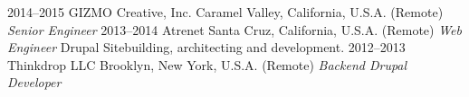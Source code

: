 \documentclass[]{friggeri-cv} %
\begin{document}
\begin{entrylist}
\entry
{2014--2015}
{GIZMO Creative, Inc.}
{Caramel Valley, California, U.S.A. (Remote)}
{\emph{Senior Engineer}
}
\entry
{2013--2014}
{Atrenet}
{Santa Cruz, California, U.S.A. (Remote)}
{\emph{Web Engineer}
Drupal Sitebuilding, architecting and development.
}
\entry
{2012--2013}
{Thinkdrop LLC}
{Brooklyn, New York, U.S.A. (Remote)}
{ \emph{Backend Drupal Developer }
}
\end{entrylist}
\end{document}
